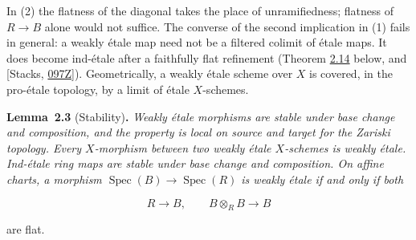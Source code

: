 \documentclass[11pt]{article}
\newenvironment{bpstatement}[2]{\par\addvspace{0.6\baselineskip}\noindent\textbf{#1}#2\textbf{.}\enspace\ignorespaces}
  {\par\addvspace{0.4\baselineskip}}
\newenvironment{bpstatementit}[2]{\begin{bpstatement}{#1}{#2}\itshape\ignorespaces}{\end{bpstatement}}
\begin{document}
In (2) the flatness of the diagonal takes the place of unramifiedness; flatness of \(R\to B\) alone would not suffice. The converse of the second implication in (1) fails in general: a weakly étale map need not be a filtered colimit of étale maps. It does become ind-étale after a faithfully flat refinement (Theorem \hyperref[bp40]{2.14} below, and [Stacks, \href{https://stacks.math.columbia.edu/tag/097Z}{097Z}]). Geometrically, a weakly étale scheme over \(X\) is covered, in the pro-étale topology, by a limit of étale \(X\)-schemes.

\label{bp10}%
\begin{bpstatementit}{Lemma~2.3}{ (Stability)}
Weakly étale morphisms are stable under base change and composition, and the property is local on source and target for the Zariski topology. Every \(X\)-morphism between two weakly étale \(X\)-schemes is weakly étale. Ind-étale ring maps are stable under base change and composition. On affine charts, a morphism \(\operatorname{Spec}(B)\to\operatorname{Spec}(R)\) is weakly étale if and only if both

\[
R\longrightarrow B,
\qquad B\otimes_RB\longrightarrow B
\]

are flat.
\end{bpstatementit}
\end{document}
